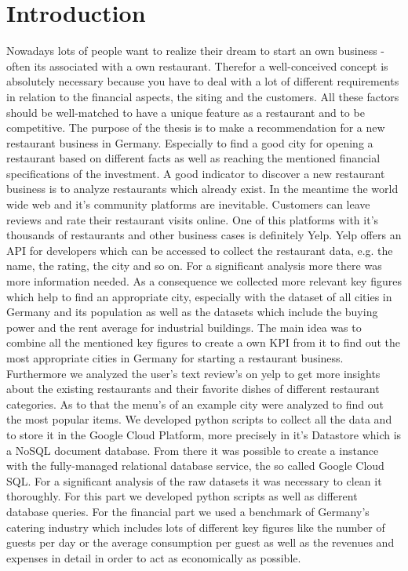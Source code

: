 \section{Introduction}
\label{sec:introduction}
Nowadays lots of people want to realize their dream to start an own business - often its associated with a own restaurant. Therefor a well-conceived concept is absolutely necessary because you have to deal with a lot of different requirements in relation to the financial aspects, the siting and the customers. All these factors should be well-matched to have a unique feature as a restaurant and to be competitive. \newline
The purpose of the thesis is to make a recommendation for a new restaurant business in Germany. Especially to find a good city for opening a restaurant based on different facts as well as reaching the mentioned financial specifications of the investment.
A good indicator to discover a new restaurant business is to analyze restaurants which already exist. In the meantime the world wide web and it's community platforms are inevitable. Customers can leave reviews and rate their restaurant visits online. One of this platforms with it's thousands of restaurants and other business cases is definitely Yelp. Yelp offers an API for developers which can be accessed to collect the restaurant data, e.g. the name, the rating, the city and so on. For a significant analysis more there was more information needed. As a consequence we collected more relevant key figures which help to find an appropriate city, especially with the dataset of all cities in Germany and its population as well as the datasets which include the buying power and the rent average for industrial buildings. The main idea was to combine all the mentioned key figures to create a own \ac{KPI} from it to find out the most appropriate cities  in Germany for starting a restaurant business. Furthermore we analyzed the user's text review's on yelp to get more insights about the existing restaurants and their favorite dishes of different restaurant categories. As to that the menu's of an example city were analyzed to find out the most popular items. We developed python scripts to collect all the data and to store it in the Google Cloud Platform, more precisely in it's Datastore which is a NoSQL document database. From there it was possible to create a \pg \space instance with the fully-managed relational database service, the so called Google Cloud SQL. For a significant analysis of the raw datasets it was necessary to clean it thoroughly. For this part we developed python scripts as well as different database queries. \newline For the financial part we used a benchmark of Germany's catering industry which includes lots of different key figures like the number of guests per day or the average consumption per guest as well as the revenues and expenses in detail in order to act as economically as possible.